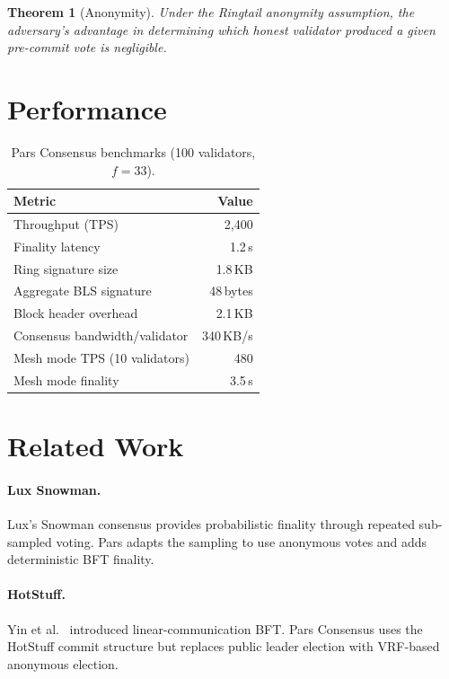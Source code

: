 \documentclass[11pt,a4paper]{article}
\newtheorem{theorem}{Theorem}[section]
\begin{document}
\begin{theorem}[Anonymity]
    Under the Ringtail anonymity assumption, the adversary's advantage
    in determining which honest validator produced a given pre-commit
    vote is negligible.
\end{theorem}

\section{Performance}
\label{sec:performance}

\begin{table}[h]
\centering
\caption{Pars Consensus benchmarks (100 validators, $f = 33$).}
\label{tab:bench}
\begin{tabular}{@{}lr@{}}
\toprule
\textbf{Metric} & \textbf{Value} \\
\midrule
Throughput (TPS)           & 2{,}400 \\
Finality latency           & 1.2\,s \\
Ring signature size         & 1.8\,KB \\
Aggregate BLS signature    & 48\,bytes \\
Block header overhead      & 2.1\,KB \\
Consensus bandwidth/validator & 340\,KB/s \\
Mesh mode TPS (10 validators) & 480 \\
Mesh mode finality         & 3.5\,s \\
\bottomrule
\end{tabular}
\end{table}

\section{Related Work}
\label{sec:related}

\paragraph{Lux Snowman.}  Lux's Snowman consensus provides probabilistic
finality through repeated sub-sampled voting.  Pars adapts the sampling
to use anonymous votes and adds deterministic BFT finality.

\paragraph{HotStuff.}  Yin et al.~\cite{hotstuff2019} introduced
linear-communication BFT.  Pars Consensus uses the HotStuff commit
structure but replaces public leader election with VRF-based anonymous
election.
\end{document}
